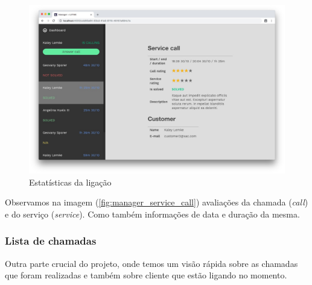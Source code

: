 \begin{figure}[ht!]
	\centering
    \includegraphics[scale=0.3]{figures/screens/manager-service-call.jpg}
	\caption{Estatísticas da ligação}
	\label{fig:manager_service_call}
\end{figure}

Observamos na imagem (\autoref{fig:manager_service_call}) avaliações da chamada (\textit{call}) e do serviço (\textit{service}). Como também informações de data e duração da mesma.

\clearpage
\subsubsection{Lista de chamadas}

Outra parte crucial do projeto, onde temos um visão rápida sobre as chamadas que foram realizadas e também sobre cliente que estão ligando no momento. 

